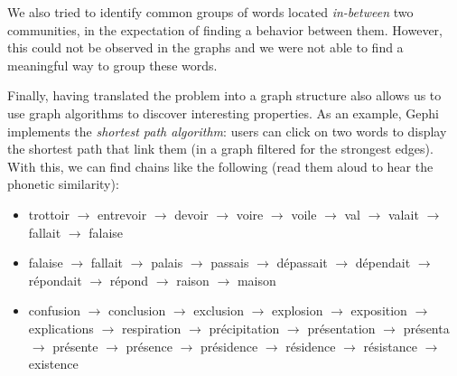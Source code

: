 We also tried to identify common groups of words located \textit{in-between} two communities, in the expectation of finding a  behavior between them. However, this could not be observed in the graphs and we were not able to find a meaningful way to group these words.

Finally, having translated the problem into a graph structure also allows us to use graph algorithms to discover interesting properties. As an example, Gephi implements the \textit{shortest path algorithm}: users can click on two words to display the shortest path that link them (in a graph filtered for the strongest edges). With this, we can find chains like the following (read them aloud to hear the phonetic similarity):
\begin{itemize}
    \item trottoir $\rightarrow$ entrevoir $\rightarrow$ devoir $\rightarrow$ voire $\rightarrow$ voile $\rightarrow$ val $\rightarrow$ valait $\rightarrow$ fallait $\rightarrow$ falaise
    \item falaise $\rightarrow$ fallait $\rightarrow$ palais $\rightarrow$ passais $\rightarrow$ dépassait $\rightarrow$ dépendait $\rightarrow$ répondait $\rightarrow$ répond $\rightarrow$ raison $\rightarrow$ maison
    \item confusion $\rightarrow$ conclusion $\rightarrow$ exclusion $\rightarrow$ explosion $\rightarrow$ exposition $\rightarrow$ explications $\rightarrow$ respiration $\rightarrow$ précipitation $\rightarrow$ présentation $\rightarrow$ présenta $\rightarrow$ présente $\rightarrow$ présence $\rightarrow$ présidence $\rightarrow$ résidence $\rightarrow$ résistance $\rightarrow$ existence
\end{itemize}

\vfill\null
